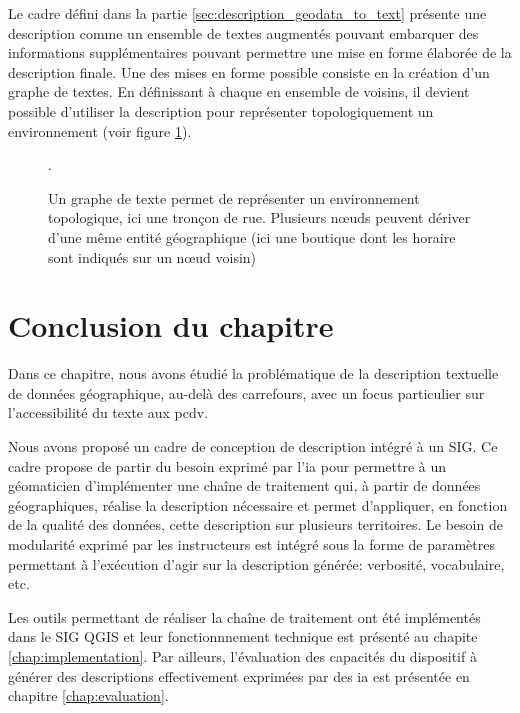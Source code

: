 \label{sec:description_graphe}

Le cadre défini dans la partie \ref{sec:description_geodata_to_text} présente une description comme un ensemble de textes augmentés pouvant embarquer des informations supplémentaires pouvant permettre une mise en forme élaborée de la description finale. Une des mises en forme possible consiste en la création d'un graphe de textes. En définissant à chaque en ensemble de voisins, il devient possible d'utiliser la description pour représenter topologiquement un environnement (voir figure \ref{fig:desc_graphe_texte}).

\begin{figure}
    \centering
    \caption{Un graphe de texte permet de représenter un environnement topologique, ici une tronçon de rue. Plusieurs nœuds peuvent dériver d'une même entité géographique (ici une boutique dont les horaire sont indiqués sur un nœud voisin)}.
    \label{fig:desc_graphe_texte}
\end{figure}
\section{Conclusion du chapitre}

Dans ce chapitre, nous avons étudié la problématique de la description textuelle de données géographique, au-delà des carrefours, avec un focus particulier sur l'accessibilité du texte aux \gls{pcdv}. 

\newpar{}

Nous avons proposé un cadre de conception de description intégré à un SIG. Ce cadre propose de partir du besoin exprimé par l'\gls{ia} pour permettre à un géomaticien d'implémenter une chaîne de traitement qui, à partir de données géographiques, réalise la description nécessaire et permet d'appliquer, en fonction de la qualité des données, cette description sur plusieurs territoires. Le besoin de modularité exprimé par les instructeurs est intégré sous la forme de paramètres permettant à l'exécution d'agir sur la description générée: verbosité, vocabulaire, etc. 

\newpar{}

Les outils permettant de réaliser la chaîne de traitement ont été implémentés dans le SIG QGIS et leur fonctionnnement technique est présenté au chapite \ref{chap:implementation}. Par ailleurs, l'évaluation des capacités du dispositif à générer des descriptions effectivement exprimées par des \gls{ia} est présentée en chapitre \ref{chap:evaluation}.